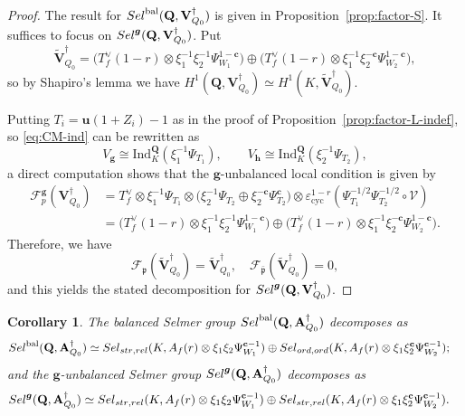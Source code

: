 \documentclass[10pt,letterpaper]{amsart}
\theoremstyle{plain}
\theoremstyle{definition}
\theoremstyle{definition}
\theoremstyle{plain}
\theoremstyle{plain}
\theoremstyle{plain}
\newtheorem{cor}[thm]{Corollary}
\theoremstyle{remark}
\numberwithin{equation}{section}
\newcommand{\cc}{\mathbf{c}}
\newcommand{\ch}{\xi}
\newcommand{\Sel}{Sel}
\newcommand{\rH}{H}
\newcommand{\pp}{\mathfrak{p}}
\newcommand{\ppbar}{\bar{\mathfrak{p}}}
\newcommand{\strrel}{{{\rm str},{\rm rel}}}
\newcommand{\ord}{{{\rm ord},{\rm ord}}}
\DeclareMathOperator{\bal}{\mathrm{bal}}
\newcommand{\Vsdag}{{\mathbf{V}_{Q_0}^\dagger}}
\newcommand{\Q}{\mathbf{Q}}
\def\Sel{{\rm Sel}}
\newcommand{\bfg}{{\boldsymbol{g}}}
\newcommand{\bfh}{{\boldsymbol{h}}}
\begin{document}
\begin{proof}
The result for $\Sel^{\bal}(\Q,\Vsdag)$ is given in Proposition~\ref{prop:factor-S}.
It suffices to focus on $\Sel^{\bfg}(\Q,\Vsdag)$. Put 
\[
\widetilde{\mathbf{V}}_{Q_0}^\dagger=\bigl(T_f^{\vee}(1-r)\otimes\ch_1^{-1}\ch_2^{-1}\Psi_{W_1}^{1-\cc}\bigr)\oplus\bigl(T_f^{\vee}(1-r)\otimes\ch_1^{-1}\ch_2^{-\cc}\Psi_{W_2}^{1-\cc}\bigr),
\] 
so by Shapiro's lemma we have $\rH^1(\Q,\Vsdag)\simeq\rH^1(K,\widetilde{\mathbf{V}}_{Q_0}^\dagger)$.
 
Putting $T_i=\mathbf{u}(1+Z_i)-1$ as in the proof of Proposition~\ref{prop:factor-L-indef}, so \eqref{eq:CM-ind} can be rewritten as
\[
V_{\bfg}\cong{\mathrm{Ind}}_K^\Q(\xi_1^{-1}\Psi_{T_1}),\quad\quad
V_{\bfh}\cong{\mathrm{Ind}}_K^\Q(\xi_2^{-1}\Psi_{T_2}),
\]
a direct computation shows that the $\bfg$-unbalanced local condition is given by
\begin{align*}
\mathscr{F}_p^\bfg(\Vsdag)&=T_f^{\vee}\otimes\ch_1^{-1}\Psi_{T_1}\otimes\bigl(\ch_2^{-1}\Psi_{T_2}\oplus\ch_2^{-\cc}\Psi_{T_2}^\cc\bigr)\otimes\varepsilon_{\mathrm{cyc}}^{1-r}(\Psi_{T_1}^{-1/2}\Psi_{T_2}^{-1/2}\circ\mathscr{V})\\
&=\bigl(T_f^{\vee}(1-r)\otimes\ch_1^{-1}\ch_2^{-1}\Psi_{W_1}^{1-\cc}\bigr)\oplus \bigl(T_f^{\vee}(1-r)\otimes\ch_1^{-1}\ch_2^{-\cc}\Psi_{W_2}^{1-\cc}\bigr).
\end{align*}
Therefore, we have 
\[ \mathscr{F}_\pp(\widetilde{\mathbf{V}}_{Q_0}^\dagger)=\widetilde{\mathbf{V}}_{Q_0}^\dagger,\quad  \mathscr{F}_{\ppbar}(\widetilde{\mathbf{V}}_{Q_0}^\dagger)=0, 
\]
and this yields the stated decomposition for $\Sel^{\bfg}(\Q,\Vsdag)$.
\end{proof}
 

\begin{cor}\label{cor:factor-S-indef}
The balanced Selmer group $\Sel^{\bal}(\Q,\mathbf{A}_{Q_0}^\dagger)$ decomposes as
\begin{align*}
\Sel^{\bal}(\Q,\mathbf{A}_{Q_0}^\dagger)&\simeq\Sel_{\strrel}(K,A_f(r)\otimes\ch_1\ch_2\Psi_{W_1}^{\cc-1})\oplus\Sel_{\ord}(K,A_f(r)\otimes\ch_1\ch_2^\cc\Psi_{W_2}^{\cc-1});
\end{align*}
and the $\bfg$-unbalanced Selmer group $\Sel^{\bfg}(\Q,\mathbf{A}_{Q_0}^\dagger)$ decomposes as
\begin{align*}
\Sel^{\bfg}(\Q,\mathbf{A}_{Q_0}^\dagger)&\simeq
\Sel_{\strrel}(K,A_f(r)\otimes\ch_1\ch_2\Psi_{W_1}^{\cc-1})\oplus\Sel_{\strrel}(K,A_f(r)\otimes\ch_1\ch_2^\cc\Psi_{W_2}^{\cc-1}).
\end{align*}
\end{cor}
\end{document}

